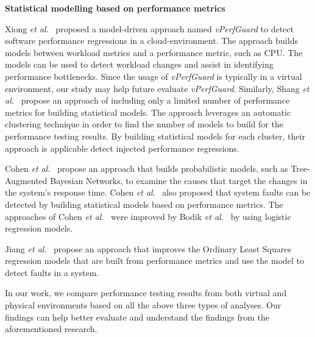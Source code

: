 \noindent \textbf{Statistical modelling based on performance metrics}

Xiong \textit{et al$.$}~\cite{xiong2013vperfguard} proposed a model-driven approach named \textit{vPerfGuard} to detect software performance regressions in a cloud-environment. The approach builds models between workload metrics and a performance metric, such as CPU. The models can be used to detect workload changes and assist in identifying performance bottlenecks. Since the usage of \emph{vPerfGuard} is typically in a virtual environment, our study may help future evaluate \textit{vPerfGuard}. Similarly, Shang\textit{ et al.}~\cite{Shang:2015:ADP:2668930.2688052} propose an approach of including only a limited number of performance metrics for building statistical models. The approach leverages an automatic clustering technique in order to find the number of models to build for the performance testing results. By building statistical models for each cluster, their approach is applicable detect injected performance regressions. %


Cohen \textit{et al$.$}~\cite{cohen2004correlating} propose an approach that builds probabilistic models, such as Tree-Augmented Bayesian Networks, to examine the causes that target the changes in the system's response time. Cohen \textit{et al$.$}~\cite{Cohen:2005:CIC:1095810.1095821} also proposed that system faults can be detected by building statistical models based on performance metrics. The approaches of Cohen \textit{et al$.$}~\cite{cohen2004correlating, Cohen:2005:CIC:1095810.1095821} were improved by Bodik \textit{et al.}~\cite{bodik2008hilighter} by using logistic regression models.

Jiang \emph{et al$.$}~\cite{Jiang:2009:SMM:1555228.1555233} propose an approach that improves the Ordinary Least Squares regression models that are built from performance metrics and use the model to detect faults in a system. 

In our work, we compare performance testing results from both virtual and physical environments based on all the above three types of analyses. Our findings can help better evaluate and understand the findings from the aforementioned research.



